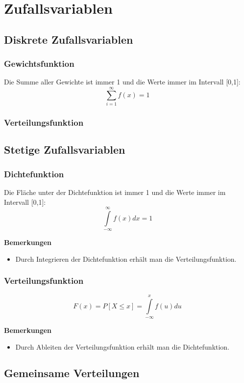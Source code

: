 \documentclass[10pt,a4paper,twocolumn]{article}
\begin{document}
\section{Zufallsvariablen}

\subsection{Diskrete Zufallsvariablen}

\subsubsection{Gewichtsfunktion}
Die Summe aller Gewichte ist immer 1 und die Werte immer im Intervall [0,1]:
\[
\sum\limits_{i=1}^{\infty}f(x)=1
\]
\subsubsection{Verteilungsfunktion}

\subsection{Stetige Zufallsvariablen}

\subsubsection{Dichtefunktion}

Die Fläche unter der Dichtefunktion ist immer 1 und die Werte immer im Intervall [0,1]: 
\[
\int\limits_{-\infty}^{\infty}f(x)dx=1
\]

\textbf{Bemerkungen}
\begin{itemize}
\item Durch Integrieren der Dichtefunktion erhält man die Verteilungsfunktion.
\end{itemize}

\subsubsection{Verteilungsfunktion}
\[
F(x) = P[X \leq x] = \int\limits_{-\infty}^{x}f(u)du
\]

\textbf{Bemerkungen}
\begin{itemize}
\item Durch Ableiten der Verteilungsfunktion erhält man die Dichtefunktion.
\end{itemize}

\subsection{Gemeinsame Verteilungen}
\end{document}
